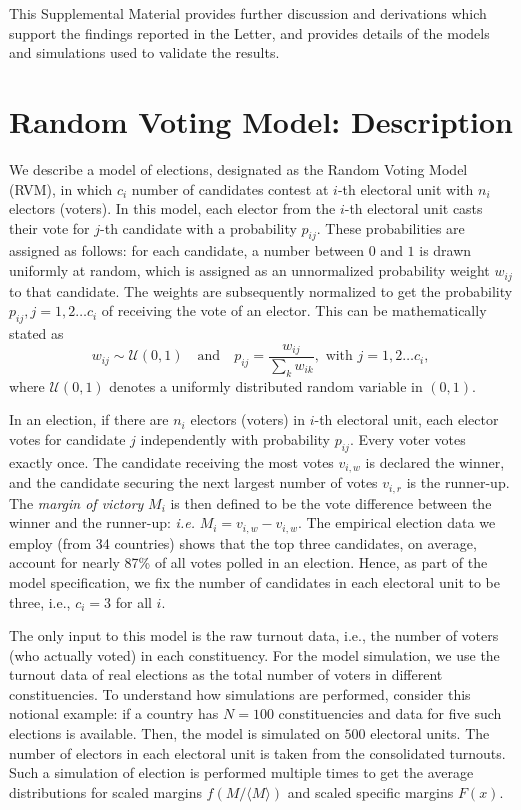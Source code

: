 \documentclass[reprint,aps,prl,showpacs,twocolumn, superscriptaddress]{revtex4-2}
\begin{document}
This Supplemental Material provides further discussion and derivations which support the findings reported in the Letter, and provides details of the models and simulations used to validate the results. 

\tableofcontents
\section{Random Voting Model: Description}
We describe a model of elections, designated as the Random Voting Model (RVM), in which $c_i$ number of candidates contest at $i$-th electoral unit with $n_i$ electors (voters). In this model, each elector from the $i$-th electoral unit casts their vote for $j$-th candidate with a probability $p_{ij}$. These probabilities are assigned as follows: for each candidate, a number between $0$ and $1$ is drawn uniformly at random, which is assigned as an unnormalized probability weight $w_{ij}$ to that candidate. The weights are subsequently normalized to get the probability $p_{ij}, j = 1, 2 \dots c_i$ of receiving the vote of an elector. This can be mathematically stated as
\begin{equation}
    w_{ij} \sim \mathcal{U}(0, 1) \quad \text{and} \quad p_{ij} = \frac{w_{ij}}{\sum_k w_{ik}}, \text{ with } j = 1, 2 \dots c_i,
\end{equation}
where $\mathcal{U}(0, 1)$ denotes a uniformly distributed random variable in $(0,1)$.

In an election, if there are $n_i$ electors (voters) in $i$-th electoral unit, each elector votes for candidate $j$ independently with probability $p_{ij}$. Every voter votes exactly once. The candidate receiving the most votes $v_{i, w}$ is declared the winner, and the candidate securing the next largest number of votes $v_{i, r}$ is the runner-up. The \emph{margin of victory} $M_i$ is then defined to be the vote difference between the winner and the runner-up: \emph{i.e.} $M_i = v_{i, w} - v_{i, w}$. The empirical election data we employ (from 34 countries) shows that the top three candidates, on average, account for nearly 87\% of all votes polled in an election.
Hence, as part of the model specification, we fix the number of candidates in each electoral unit to be three, i.e., 
$c_i = 3$ for all $i$.

The only input to this model is the raw turnout data, i.e., the number of voters (who actually voted) in each constituency. For the model simulation, we use the turnout data of real elections as the total number of voters in different constituencies. To understand how simulations are performed, consider this notional example: if a country has $N=100$ constituencies and data for five such elections is available. Then, the model is simulated on $500$ electoral units. The number of electors in each electoral unit is taken from the consolidated turnouts. Such a simulation of election is performed multiple times to get the average distributions for scaled margins $f(M / \langle M \rangle)$ and scaled specific margins $F(x)$.
\end{document}
